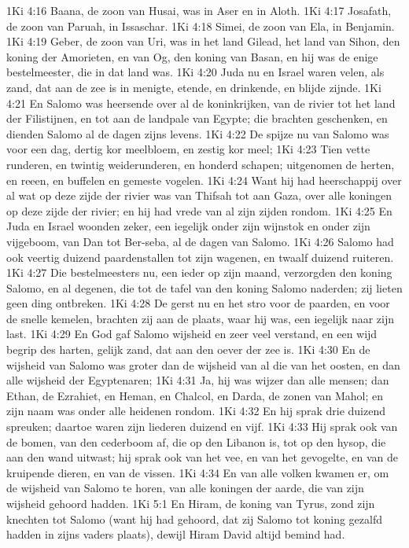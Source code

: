 1Ki 4:16  Baana, de zoon van Husai, was in Aser en in Aloth.
1Ki 4:17  Josafath, de zoon van Paruah, in Issaschar.
1Ki 4:18  Simei, de zoon van Ela, in Benjamin.
1Ki 4:19  Geber, de zoon van Uri, was in het land Gilead, het land van Sihon, den koning der Amorieten, en van Og, den koning van Basan, en hij was de enige bestelmeester, die in dat land was.
1Ki 4:20  Juda nu en Israel waren velen, als zand, dat aan de zee is in menigte, etende, en drinkende, en blijde zijnde.
1Ki 4:21  En Salomo was heersende over al de koninkrijken, van de rivier tot het land der Filistijnen, en tot aan de landpale van Egypte; die brachten geschenken, en dienden Salomo al de dagen zijns levens.
1Ki 4:22  De spijze nu van Salomo was voor een dag, dertig kor meelbloem, en zestig kor meel;
1Ki 4:23  Tien vette runderen, en twintig weiderunderen, en honderd schapen; uitgenomen de herten, en reeen, en buffelen en gemeste vogelen.
1Ki 4:24  Want hij had heerschappij over al wat op deze zijde der rivier was van Thifsah tot aan Gaza, over alle koningen op deze zijde der rivier; en hij had vrede van al zijn zijden rondom.
1Ki 4:25  En Juda en Israel woonden zeker, een iegelijk onder zijn wijnstok en onder zijn vijgeboom, van Dan tot Ber-seba, al de dagen van Salomo.
1Ki 4:26  Salomo had ook veertig duizend paardenstallen tot zijn wagenen, en twaalf duizend ruiteren.
1Ki 4:27  Die bestelmeesters nu, een ieder op zijn maand, verzorgden den koning Salomo, en al degenen, die tot de tafel van den koning Salomo naderden; zij lieten geen ding ontbreken.
1Ki 4:28  De gerst nu en het stro voor de paarden, en voor de snelle kemelen, brachten zij aan de plaats, waar hij was, een iegelijk naar zijn last.
1Ki 4:29  En God gaf Salomo wijsheid en zeer veel verstand, en een wijd begrip des harten, gelijk zand, dat aan den oever der zee is.
1Ki 4:30  En de wijsheid van Salomo was groter dan de wijsheid van al die van het oosten, en dan alle wijsheid der Egyptenaren;
1Ki 4:31  Ja, hij was wijzer dan alle mensen; dan Ethan, de Ezrahiet, en Heman, en Chalcol, en Darda, de zonen van Mahol; en zijn naam was onder alle heidenen rondom.
1Ki 4:32  En hij sprak drie duizend spreuken; daartoe waren zijn liederen duizend en vijf.
1Ki 4:33  Hij sprak ook van de bomen, van den cederboom af, die op den Libanon is, tot op den hysop, die aan den wand uitwast; hij sprak ook van het vee, en van het gevogelte, en van de kruipende dieren, en van de vissen.
1Ki 4:34  En van alle volken kwamen er, om de wijsheid van Salomo te horen, van alle koningen der aarde, die van zijn wijsheid gehoord hadden.
1Ki 5:1  En Hiram, de koning van Tyrus, zond zijn knechten tot Salomo (want hij had gehoord, dat zij Salomo tot koning gezalfd hadden in zijns vaders plaats), dewijl Hiram David altijd bemind had.

